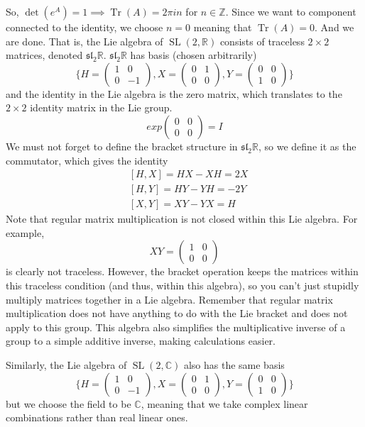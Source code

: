 \documentclass{article}
\DeclareMathOperator{\Tr}{Tr}
\DeclareMathOperator{\SL}{SL}
\begin{document}
    So, $\det{(e^A)} = 1 \implies \Tr{(A)} = 2 \pi i n$ for $n \in \mathbb{Z}$. Since we want to component connected to the identity, we choose $n=0$ meaning that $\Tr{(A)} = 0$. And we are done. That is, the Lie algebra of $\SL(2, \mathbb{R})$ consists of traceless $2 \times 2$ matrices, denoted $\mathfrak{sl}_2 \mathbb{R}$. $\mathfrak{sl}_2 \mathbb{R}$ has basis (chosen arbitrarily) 
    \[\bigg\{ H = \begin{pmatrix}
    1&0\\0&-1
    \end{pmatrix}, X = \begin{pmatrix}
    0&1\\0&0
    \end{pmatrix}, Y = \begin{pmatrix}
    0&0\\1&0
    \end{pmatrix}\bigg\}\]
    and the identity in the Lie algebra is the zero matrix, which translates to the $2 \times 2$ identity matrix in the Lie group. 
    \[exp \begin{pmatrix}
    0&0\\0&0
    \end{pmatrix} = I\]
    We must not forget to define the bracket structure in $\mathfrak{sl}_2 \mathbb{R}$, so we define it as the commutator, which gives the identity
    \begin{align*}
        & [H,X] = HX - XH = 2X \\
        & [H,Y] = HY - YH = -2Y \\
        & [X,Y] = XY - YX = H
    \end{align*}
    Note that regular matrix multiplication is not closed within this Lie algebra. For example, 
    \[X Y = \begin{pmatrix}
    1&0\\0&0
    \end{pmatrix}\]
    is clearly not traceless. However, the bracket operation keeps the matrices within this traceless condition (and thus, within this algebra), so you can't just stupidly multiply matrices together in a Lie algebra. Remember that regular matrix multiplication does not have anything to do with the Lie bracket and does not apply to this group. This algebra also simplifies the multiplicative inverse of a group to a simple additive inverse, making calculations easier. 

    Similarly, the Lie algebra of $\SL(2, \mathbb{C})$ also has the same basis 
    \[\bigg\{ H = \begin{pmatrix}
    1&0\\0&-1
    \end{pmatrix}, X = \begin{pmatrix}
    0&1\\0&0
    \end{pmatrix}, Y = \begin{pmatrix}
    0&0\\1&0
    \end{pmatrix}\bigg\}\]
    but we choose the field to be $\mathbb{C}$, meaning that we take complex linear combinations rather than real linear ones. 
\end{document}
